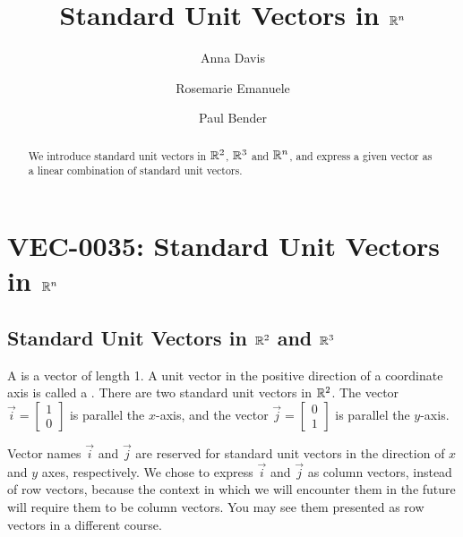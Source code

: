 \documentclass{ximera}
\author{Anna Davis \and Rosemarie Emanuele \and Paul Bender} \title{Standard Unit Vectors in $\mathbb{R}^n$} \license{CC-BY 4.0}
\begin{document}
\begin{abstract}
 We introduce standard unit vectors in $\mathbb{R}^2$, $\mathbb{R}^3$ and $\mathbb{R}^n$, and express a given vector as a linear combination of standard unit vectors. 
\end{abstract}
\maketitle

\section*{VEC-0035:  Standard Unit Vectors in $\mathbb{R}^n$}

\subsection*{Standard Unit Vectors in $\mathbb{R}^2$ and $\mathbb{R}^3$} 
A  is a vector of length 1.  A unit vector in the positive direction of a coordinate axis is called a .  There are two standard unit vectors in $\mathbb{R}^2$.  The vector $\vec{i}=\begin{bmatrix}
1\\
0
\end{bmatrix}$ is parallel the $x$-axis, and the vector $\vec{j}=\begin{bmatrix}
0\\
1
\end{bmatrix}$ is parallel the $y$-axis.  

\begin{center}
\end{center}

Vector names $\vec{i}$ and $\vec{j}$ are reserved for standard unit vectors in the direction of $x$ and $y$ axes, respectively.  We chose to express $\vec{i}$ and $\vec{j}$ as column vectors, instead of row vectors, because the context in which we will encounter them in the future will require them to be column vectors.  You may see them presented as row vectors in a different course.
\end{document}

